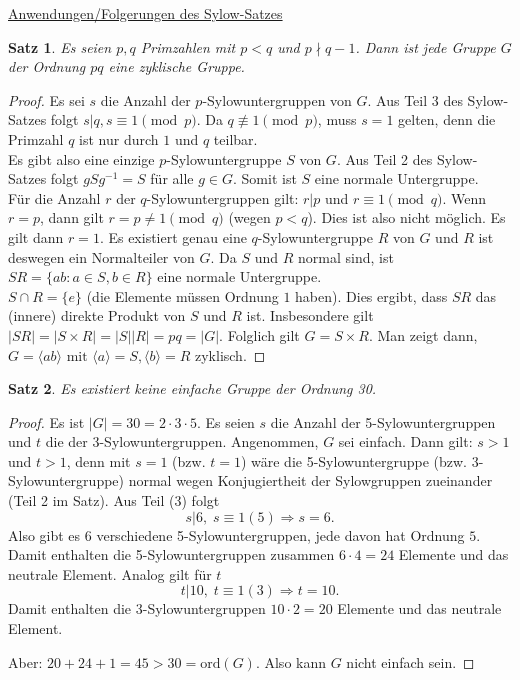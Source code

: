 \documentclass[12pt]{scrartcl}%
\newtheorem{thm}{Satz}
\theoremstyle{definition}
\theoremstyle{remark}
\begin{document}
\underline{Anwendungen/Folgerungen des Sylow-Satzes}

\begin{thm}
	Es seien $p, q$ Primzahlen mit $p < q$ und $p \nmid q-1$. Dann ist jede Gruppe $G$ der Ordnung $pq$ eine zyklische Gruppe.
\end{thm}

\begin{proof}
	Es sei $s$ die Anzahl der $p$-Sylowuntergruppen von $G$. Aus Teil 3 des Sylow-Satzes folgt $s | q, s \equiv 1 \pmod{p}$. Da $q \not \equiv 1 \pmod{p}$, muss $s = 1$ gelten, denn die Primzahl $q$ ist nur durch $1$ und $q$ teilbar. \\
	Es gibt also eine einzige $p$-Sylowuntergruppe $S$ von $G$. Aus Teil 2 des Sylow-Satzes folgt $gSg^{-1} = S$ für alle $g \in G$. Somit ist $S$ eine normale Untergruppe. \\
	Für die Anzahl $r$ der $q$-Sylowuntergruppen gilt: $r | p$ und $r \equiv 1 \pmod{q}$. Wenn $r = p$, dann gilt $r = p \not = 1 \pmod{q}$ (wegen $p < q$). Dies ist also nicht möglich. Es gilt dann $r = 1$. Es existiert genau eine $q$-Sylowuntergruppe $R$ von $G$ und $R$ ist deswegen ein Normalteiler von $G$. Da $S$ und $R$ normal sind, ist $SR = \{ ab : a \in S, b \in R\}$ eine normale Untergruppe. \\
	$S \cap R = \{ e\}$ (die Elemente müssen Ordnung $1$ haben). Dies ergibt, dass $SR$ das (innere) direkte Produkt von $S$ und $R$ ist. Insbesondere gilt $|SR| = |S \times R| = |S||R| = pq = |G|$. Folglich gilt $G = S \times R$. Man zeigt dann, $G = \langle ab \rangle \text{ mit } \langle a \rangle = S, \langle b \rangle = R$ zyklisch.
\end{proof}

\begin{thm}
    Es existiert keine einfache Gruppe der Ordnung 30.
\end{thm}

\begin{proof}
    Es ist $|G| = 30 = 2\cdot 3\cdot 5$. Es seien $s$ die Anzahl der 5-Sylowuntergruppen und $t$ die der 3-Sylowuntergruppen. Angenommen, $G$ sei einfach. Dann gilt: $s>1$ und $t>1$, denn mit $s=1$ (bzw. $t=1$) wäre die 5-Sylowuntergruppe (bzw. 3-Sylowuntergruppe) normal wegen Konjugiertheit der Sylowgruppen zueinander (Teil 2 im Satz). Aus Teil (3) folgt
        \[ s|6,\; s\equiv 1(5)\Rightarrow s=6.\]
    Also gibt es 6 verschiedene 5-Sylowuntergruppen, jede davon hat Ordnung $5$. Damit enthalten die 5-Sylowuntergruppen zusammen $6\cdot 4 =24$ Elemente und das neutrale Element. Analog gilt für $t$
        \[ t|10,\; t\equiv 1(3) \Rightarrow t=10.\]
    Damit enthalten die 3-Sylowuntergruppen $10\cdot 2=20$ Elemente und das neutrale Element.
    
    Aber: $20+24+1=45>30=\text{ord}(G)$. Also kann $G$ nicht einfach sein.
\end{proof}
\end{document}
